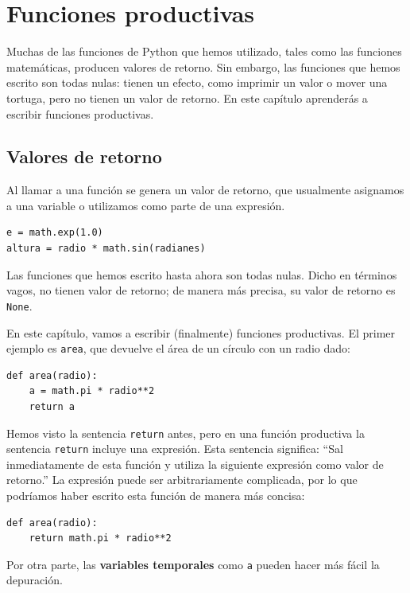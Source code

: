 \documentclass[10pt]{book}
\begin{document}
\chapter{Funciones productivas}
\label{fruitchap}

Muchas de las funciones de Python que hemos utilizado, tales como las funciones
matemáticas, producen valores de retorno. Sin embargo, las funciones que hemos escrito
son todas nulas: tienen un efecto, como imprimir un valor
o mover una tortuga, pero no tienen un valor de retorno.  En
este capítulo aprenderás a escribir funciones productivas.


\section{Valores de retorno}

Al llamar a una función se genera un valor de
retorno, que usualmente asignamos a una variable o utilizamos como parte de una
expresión.

\begin{verbatim}
e = math.exp(1.0)
altura = radio * math.sin(radianes)
\end{verbatim}
%
Las funciones que hemos escrito hasta ahora son todas nulas.  Dicho en términos vagos,
no tienen valor de retorno; de manera más precisa,
su valor de retorno es {\tt None}.

En este capítulo, vamos a escribir (finalmente) funciones productivas.
El primer ejemplo es {\tt area}, que devuelve el área de un círculo
con un radio dado:

\begin{verbatim}
def area(radio):
    a = math.pi * radio**2
    return a
\end{verbatim}
%
Hemos visto la sentencia {\tt return} antes, pero en una función
productiva la sentencia {\tt return} incluye
una expresión.  Esta sentencia significa: ``Sal inmediatamente de
esta función y utiliza la siguiente expresión como valor de retorno.''
La expresión puede ser arbitrariamente complicada, por lo que podríamos
haber escrito esta función de manera más concisa:

\begin{verbatim}
def area(radio):
    return math.pi * radio**2
\end{verbatim}
%
Por otra parte, las {\bf variables temporales} como {\tt a} pueden hacer
más fácil la depuración.
\end{document}
